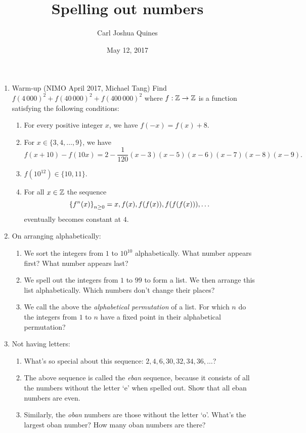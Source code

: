 \documentclass[11pt,paper=letter]{scrartcl}
\begin{document}
\title{Spelling out numbers}
\author{Carl Joshua Quines}
\date{May 12, 2017}

\maketitle

\begin{enumerate}
  \item Warm-up (NIMO April 2017, Michael Tang) Find $f(4\,000)^2 + f(40\,000)^2 + f(400\,000)^2$ where $f : \mathbb Z \rightarrow \mathbb Z$ is a function satisfying the following conditions:
  \begin{enumerate}
    \item For every positive integer $x$, we have $f(-x) = f(x) + 8$.
    \item For $x \in \{3, 4, \ldots, 9\}$, we have $$f(x+10) - f(10x) = 2 - \frac1{120}(x-3)(x-5)(x-6)(x-7)(x-8)(x-9).$$
    \item $f(10^{12}) \in \{10, 11\}.$
    \item For all $x \in \mathbb Z$ the sequence $$\left\{ f^n(x) \right\}_{n \geq 0} = x, f(x), f(f(x)), f(f(f(x))), \ldots$$ eventually becomes constant at $4$.
  \end{enumerate}
  \item On arranging alphabetically:
  \begin{enumerate}
    \item We sort the integers from $1$ to $10^{10}$ alphabetically. What number appears first? What number appears last?
    \item We spell out the integers from $1$ to $99$ to form a list. We then arrange this list alphabetically. Which numbers don't change their places? 
    \item We call the above the \emph{alphabetical permutation} of a list. For which $n$ do the integers from $1$ to $n$ have a fixed point in their alphabetical permutation?
  \end{enumerate}
  \item Not having letters:
  \begin{enumerate}
    \item What's so special about this sequence: $2, 4, 6, 30, 32, 34, 36, \ldots$?
    \item The above sequence is called the \emph{eban} sequence, because it consists of all the numbers without the letter `e' when spelled out. Show that all eban numbers are even.
    \item Similarly, the \emph{oban} numbers are those without the letter `o'. What's the largest oban number? How many oban numbers are there?

\end{enumerate}
\end{enumerate}
\end{document}
